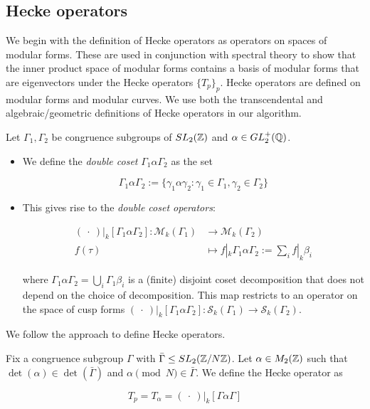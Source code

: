 \subsection{Hecke operators}

We begin with the definition of Hecke operators as operators on spaces of modular forms. These are used in conjunction with spectral theory to show that the inner product space of modular forms contains a basis of modular forms that are eigenvectors under the Hecke operators $\{T_p\}_p$. Hecke operators are defined on modular forms and modular curves. We use both the transcendental and algebraic/geometric definitions of Hecke operators in our algorithm.

\begin{defn}
Let $\Gamma_1, \Gamma_2$ be congruence subgroups of $SL_2(\mathbb{Z})$ and $\alpha \in GL_2^+(\mathbb{Q})$. 

\begin{itemize}
    \item We define the \textit{double coset} $\Gamma_1 \alpha \Gamma_2$ as the set 

\[
\Gamma_1 \alpha \Gamma_2 := \{\gamma_1 \alpha \gamma_2 : \gamma_1 \in \Gamma_1, \gamma_2 \in \Gamma_2\}
\]
\item This gives rise to the \textit{double coset operators}:

\begin{align*}
(\ \cdot \ )|_k [\Gamma_1 \alpha \Gamma_2] : \mathcal{M}_k(\Gamma_1) &\rightarrow \mathcal{M}_k(\Gamma_2) \\
f(\tau) &\mapsto f|_k \Gamma_1 \alpha \Gamma_2 := \sum_i f|_k \beta_i
\end{align*}

where $\Gamma_1 \alpha \Gamma_2 = \bigcup_i \Gamma_1 \beta_i$ is a (finite) disjoint coset decomposition that does not depend on the choice of decomposition. This map restricts to an operator on the space of cusp forms $(\ \cdot \ )|_k [\Gamma_1 \alpha \Gamma_2] : \mathcal{S}_k(\Gamma_1) \rightarrow \mathcal{S}_k(\Gamma_2)$.
\end{itemize}
\end{defn}

We follow the approach \cite{Assaf2020} to define Hecke operators.

\begin{defn}
Fix a congruence subgroup $\Gamma$ with $\bar{\Gamma} \leq SL_2(\mathbb{Z}/N\mathbb{Z})$.
Let $\alpha \in M_2(\mathbb{Z})$ such that $\det (\alpha) \in \det (\bar{\Gamma})$ and $\alpha \pmod{N} \in \bar{\Gamma}$. We define the Hecke operator as

\[
T_p = T_\alpha = ( \ \cdot \ )|_k [\Gamma \alpha \Gamma]
\]
\end{defn}

